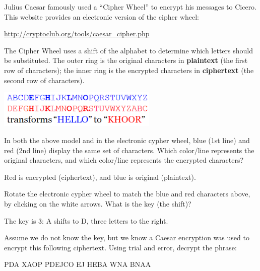 

Julius Caesar famously used a ``Cipher Wheel'' to encrypt his messages to Cicero.
This website provides an electronic version of the cipher wheel:

\begin{center}
\url{http://cryptoclub.org/tools/caesar_cipher.php}
\end{center}

The Cipher Wheel uses a shift of the alphabet to determine which letters should be substituted.
The outer ring is the original characters in \textbf{plaintext} (the first row of characters); the inner ring is the encrypted characters in \textbf{ciphertext} (the second row of characters).

\begin{center}
\includegraphics[height=0.7in]{caesar1.png}
\end{center}




\Q In both the above model and in the electronic cypher wheel, blue (1st line) and red (2nd line) display the same set of characters.
Which color/line represents the original characters, and which color/line represents the encrypted characters?

\begin{answer}
Red is encrypted (ciphertext), and blue is original (plaintext).
\end{answer}


\Q Rotate the electronic cypher wheel to match the blue and red characters above, by clicking on the white arrows.
What is the key (the shift)?

\begin{answer}
The key is 3: A shifts to D, three letters to the right.
\end{answer}


\Q Assume we do not know the key, but we know a Caesar encryption was used to encrypt this following ciphertext.
Using trial and error, decrypt the phrase:

\begin{center}
PDA XAOP PDEJCO EJ HEBA WNA BNAA
\end{center}

